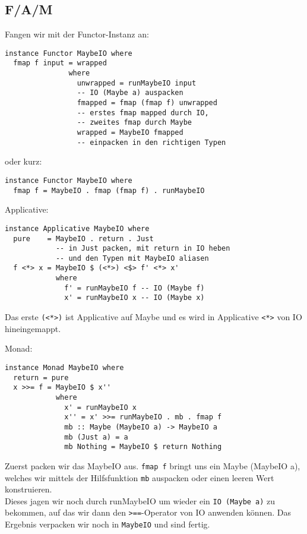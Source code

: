 \documentclass{beamer}
\begin{document}
\subsection{F/A/M}
\begin{frame}[fragile]
Fangen wir mit der Functor-Instanz an:
\begin{verbatim}
instance Functor MaybeIO where
  fmap f input = wrapped
               where
                 unwrapped = runMaybeIO input
                 -- IO (Maybe a) auspacken
                 fmapped = fmap (fmap f) unwrapped
                 -- erstes fmap mapped durch IO,
                 -- zweites fmap durch Maybe
                 wrapped = MaybeIO fmapped
                 -- einpacken in den richtigen Typen
\end{verbatim}
\pause
oder kurz:
\begin{verbatim}
instance Functor MaybeIO where
  fmap f = MaybeIO . fmap (fmap f) . runMaybeIO
\end{verbatim}
\end{frame}

\begin{frame}[fragile]
Applicative:
\begin{verbatim}
instance Applicative MaybeIO where
  pure    = MaybeIO . return . Just
            -- in Just packen, mit return in IO heben
            -- und den Typen mit MaybeIO aliasen
  f <*> x = MaybeIO $ (<*>) <$> f' <*> x'
            where
              f' = runMaybeIO f -- IO (Maybe f)
              x' = runMaybeIO x -- IO (Maybe x)
\end{verbatim}
Das erste \texttt{(<*>)} ist Applicative auf Maybe und es wird in Applicative \texttt{<*>} von IO hineingemappt.
\end{frame}

\begin{frame}[fragile]
Monad:
\begin{verbatim}
instance Monad MaybeIO where
  return = pure
  x >>= f = MaybeIO $ x''
            where
              x' = runMaybeIO x
              x'' = x' >>= runMaybeIO . mb . fmap f
              mb :: Maybe (MaybeIO a) -> MaybeIO a
              mb (Just a) = a
              mb Nothing = MaybeIO $ return Nothing
\end{verbatim}
Zuerst packen wir das MaybeIO aus. \texttt{fmap f} bringt uns ein Maybe (MaybeIO a), welches wir mittels der Hilfsfunktion \texttt{mb} auspacken oder einen leeren Wert konstruieren.\\
Dieses jagen wir noch durch runMaybeIO um wieder ein \texttt{IO (Maybe a)} zu bekommen, auf das wir dann den \texttt{>==}-Operator von IO anwenden können. Das Ergebnis verpacken wir noch in \texttt{MaybeIO} und sind fertig.
\end{frame}
\end{document}
